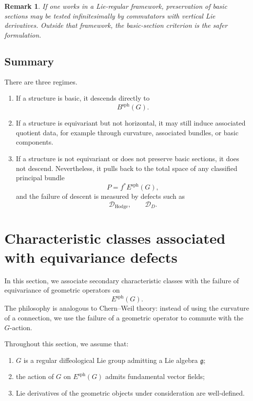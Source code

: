 \documentclass[11pt]{amsart}
\newtheorem{remark}[definition]{Remark}
\begin{document}
\begin{remark}
If one works in a Lie-regular framework, preservation of basic sections may be
tested infinitesimally by commutators with vertical Lie derivatives. Outside
that framework, the basic-section criterion is the safer formulation.
\end{remark}

\subsection{Summary}

There are three regimes.

\begin{enumerate}
\item If a structure is basic, it descends directly to
\[
B^{\mathrm{sph}}(G).
\]

\item If a structure is equivariant but not horizontal, it may still induce
associated quotient data, for example through curvature, associated bundles,
or basic components.

\item If a structure is not equivariant or does not preserve basic sections, it
does not descend. Nevertheless, it pulls back to the total space of any
classified principal bundle
\[
P=f^*E^{\mathrm{sph}}(G),
\]
and the failure of descent is measured by defects such as
\[
\mathcal D_{\mathrm{Hodge}},
\qquad
\mathcal D_D.
\]
\end{enumerate}

\section{Characteristic classes associated with equivariance defects}
\label{sec:defect-classes}

In this section, we associate secondary characteristic classes with the
failure of equivariance of geometric operators on
\[
E^{\mathrm{sph}}(G).
\]
The philosophy is analogous to Chern--Weil theory: instead of using the
curvature of a connection, we use the failure of a geometric operator to
commute with the \(G\)-action.

Throughout this section, we assume that:
\begin{enumerate}
\item \(G\) is a regular diffeological Lie group admitting a Lie algebra
\(\mathfrak g\);
\item the action of \(G\) on \(E^{\mathrm{sph}}(G)\) admits fundamental vector
fields;
\item Lie derivatives of the geometric objects under consideration are
well-defined.
\end{enumerate}
\end{document}
